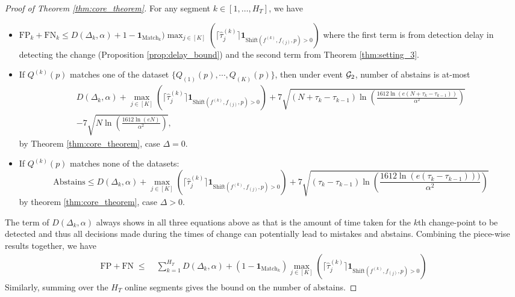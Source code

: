 \begin{proof}[Proof of Theorem \ref{thm:core_theorem}]
    For any segment $k \in [1, \ldots, H_T]$,  we have 
    \begin{itemize}
        \item $\text{FP}_k + \text{FN}_k  \leq D(\Delta_{k},\alpha) +   1-\mathbf{1}_{\text{Match}_k})\max_{ j \in [K]} \left(\lceil \widehat{\tau}_j^{(k)}\rceil \mathbf{1}_{\text{Shift}(f^{(k)},f_{(j)},p) > 0}\right)$ where the first term is from detection delay in detecting the change (Proposition \ref{prop:delay_bound}) and the second term from Theorem \ref{thm:setting_3}.
        \item If $Q^{(k)}(p)$ matches one of the dataset $\{Q_{(1)}(p), \cdots, Q_{(K)}(p)\}$, then under event ${\mathcal{G}}_2$, number of abstains is at-most
        \begin{align*}
           D(\Delta_k, \alpha)+ \max_{ j \in [K]} \left(\lceil \widehat{\tau}_j^{(k)}\rceil \mathbf{1}_{\text{Shift}(f^{(k)},f_{(j)},p) > 0}\right) + 7 \sqrt{(N+\tau_k - \tau_{k-1}) \ln \left( \frac{1612\ln(e(N+\tau_k - \tau_{k-1}))}{\alpha^2} \right)} \\ - 7 \sqrt{N \ln \left( \frac{1612\ln(eN)}{\alpha^2} \right)},
        \end{align*}
        by Theorem \ref{thm:core_theorem}, case $\Delta = 0$.
        \item  If $Q^{(k)}(p)$ matches none of the datasets:
        \[ \text{Abstains} \leq   D(\Delta_k, \alpha)+ \max_{ j \in [K]} \left(\lceil \widehat{\tau}_j^{(k)}\rceil \mathbf{1}_{\text{Shift}(f^{(k)},f_{(j)},p) > 0}\right) + 7 \sqrt{(\tau_k - \tau_{k-1}) \ln \left( \frac{1612\ln(e(\tau_k - \tau_{k-1})))}{\alpha^2} \right)} 
        \]
        by theorem \ref{thm:core_theorem}, case $\Delta > 0$.
    \end{itemize}
The term of $D(\Delta_k, \alpha)$ always shows in all three equations above as that is the amount of time taken for the $k$th change-point to be detected and thus all decisions made during the times of change can potentially lead to mistakes and abstains. Combining the piece-wise results together, we have 
    \begin{align*}
    \text{FP} + \text{FN} \;  \leq \; & \sum_{k=1}^{H_T}D(\Delta_{k},\alpha) + (1-\mathbf{1}_{\text{Match}_k})  \max_{ j \in [K]} \left(\lceil \widehat{\tau}_j^{(k)}\rceil \mathbf{1}_{\text{Shift}(f^{(k)},f_{(j)},p) > 0}\right) 
        \end{align*}
        Similarly, summing over the $H_T$ online segments gives the bound on the number of abstains. 

\end{proof}

